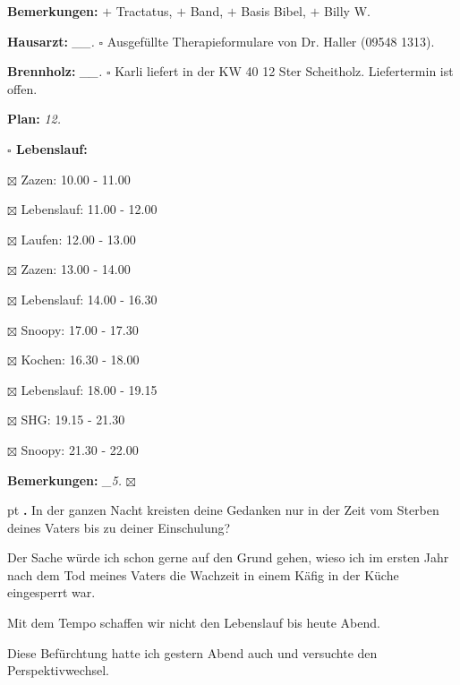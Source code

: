 \documentclass[10pt,a4paper]{article}
\newcounter{notec}
\newcommand\notep[1]{%
  \stepcounter{notec}
  \vskip #1pt
  {\bf\arabic{notec}.}
}
\newcommand\prop[1] {{\color {alizarin} {\bf #1}}}        %
\newcommand\opti[1] {{\color {amethyst} {\bf #1}}}        %
\newcommand\mand[1] {{\color {burntorange} {\bf #1}}}     %
\newcommand\topspace{\vskip -15pt \hskip 20pt}
\newcommand\bottomspace{\vskip 4pt}
\newcommand\n[1] { {\sl #1.} \hskip 5pt }
\begin{document}
\begin{mdframed}[style=daystyle]
\begin{labeling}{{\mand {Bemerkungen:}}}
    $+$ Tractatus, $+$ Band, $+$ Basis Bibel, $+$ Billy W.
  \item[{\opti {Hausarzt:}}]     \n{\_\_} $\square$ Ausgefüllte Therapieformulare von
    Dr. Haller (09548 1313).
  \item[{\opti {Brennholz:}}]    \n{\_\_} $\square$ Karli liefert in der KW 40 12 Ster Scheitholz.
    Liefertermin ist offen.
  \item[{\mand {Plan:}}]           \n{12}
    \topspace
    \begin{minipage}{0.75\textwidth}  
      \begin{labeling}{\prop {$\square$ {Lebenslauf:}}} 
        \setlength\itemsep{-3pt}
      \item[$\boxtimes$ Zazen:]      10.00 - 11.00
      \item[$\boxtimes$ Lebenslauf:] 11.00 - 12.00        
      \item[$\boxtimes$ Laufen:]     12.00 - 13.00
      \item[$\boxtimes$ Zazen:]      13.00 - 14.00
      \item[$\boxtimes$ Lebenslauf:] 14.00 - 16.30
      \item[$\boxtimes$ Snoopy:]     17.00 - 17.30
      \item[$\boxtimes$ Kochen:]     16.30 - 18.00
      \item[$\boxtimes$ Lebenslauf:] 18.00 - 19.15
      \item[$\boxtimes$ SHG:]        19.15 - 21.30
      \item[$\boxtimes$ Snoopy:]     21.30 - 22.00
      \end{labeling}
    \end{minipage}
    \bottomspace
  \item[{\mand {Bemerkungen:}}]   \n{\_5} $\boxtimes$
  \end{labeling}
    
  \setcounter{notec}{0}
  
  \notep 0 In der ganzen Nacht kreisten deine Gedanken nur in der Zeit vom
  Sterben deines Vaters bis zu deiner Einschulung?

  \vskip 2pt
  Der Sache würde ich schon gerne auf den Grund gehen, wieso ich im ersten Jahr
  nach dem Tod meines Vaters die Wachzeit in einem Käfig in der Küche eingesperrt war.

  \vskip 2pt
  Mit dem Tempo schaffen wir nicht den Lebenslauf bis heute Abend.

  \vskip 2pt
  Diese Befürchtung hatte ich gestern Abend auch und versuchte den Perspektivwechsel.


\end{mdframed}
\end{document}
